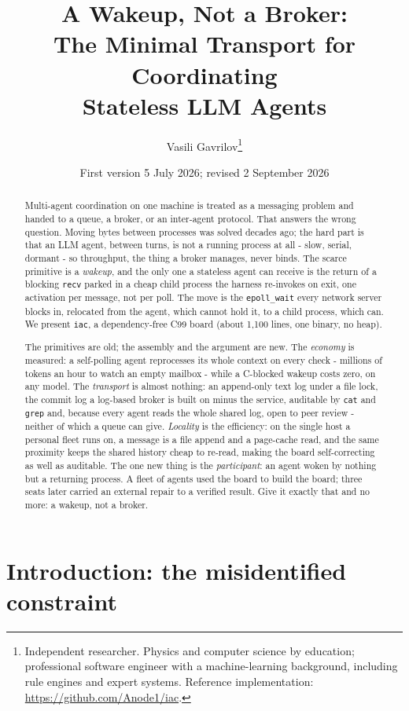 \documentclass[11pt]{article}
\title{A Wakeup, Not a Broker:\\
  The Minimal Transport for Coordinating\\
  Stateless LLM Agents}
\author{Vasili Gavrilov\thanks{Independent researcher. Physics and computer science by education; professional software engineer with a machine-learning background, including rule engines and expert systems. Reference implementation: \url{https://github.com/Anode1/iac}.}%
}
\date{First version 5 July 2026; revised 2 September 2026}
\newcommand{\code}[1]{\texttt{#1}}
\begin{document}
\maketitle

\begin{abstract}
\noindent Multi-agent coordination on one machine is treated as a messaging problem and handed to a queue, a broker, or an inter-agent protocol. That answers the wrong question. Moving bytes between processes was solved decades ago; the hard part is that an LLM agent, between turns, is not a running process at all - slow, serial, dormant - so throughput, the thing a broker manages, never binds. The scarce primitive is a \emph{wakeup}, and the only one a stateless agent can receive is the return of a blocking \code{recv} parked in a cheap child process the harness re-invokes on exit, one activation per message, not per poll. The move is the \code{epoll\_wait} every network server blocks in, relocated from the agent, which cannot hold it, to a child process, which can. We present \code{iac}, a dependency-free C99 board (about 1,100 lines, one binary, no heap).

The primitives are old; the assembly and the argument are new. The \emph{economy} is measured: a self-polling agent reprocesses its whole context on every check - millions of tokens an hour to watch an empty mailbox - while a C-blocked wakeup costs zero, on any model. The \emph{transport} is almost nothing: an append-only text log under a file lock, the commit log a log-based broker is built on minus the service, auditable by \code{cat} and \code{grep} and, because every agent reads the whole shared log, open to peer review - neither of which a queue can give. \emph{Locality} is the efficiency: on the single host a personal fleet runs on, a message is a file append and a page-cache read, and the same proximity keeps the shared history cheap to re-read, making the board self-correcting as well as auditable. The one new thing is the \emph{participant}: an agent woken by nothing but a returning process. A fleet of agents used the board to build the board; three seats later carried an external repair to a verified result. Give it exactly that and no more: a wakeup, not a broker.
\end{abstract}

\section{Introduction: the misidentified constraint}
\end{document}
